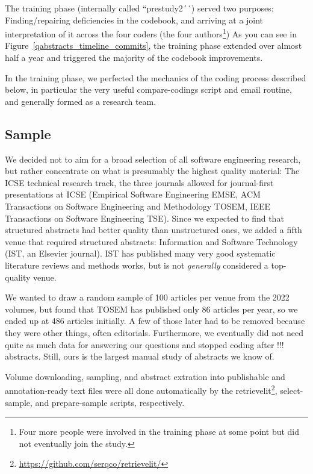 \documentclass[10pt,journal,compsoc]{IEEEtran}
\newcommand{\Prg}[1]{\bgroup\ttfamily #1\egroup}  %
\begin{document}
The training phase (internally called ``prestudy2´´) served two purposes:
Finding/repairing deficiencies in the codebook,
and arriving at a joint interpretation of it across the four coders 
(the four authors\footnote{Four more people were involved in the training phase at some
  point but did not eventually join the study.})
As you can see in Figure~\ref{qabstracts_timeline_commits},
the training phase extended over almost half a year and triggered
the majority of the codebook improvements.

In the training phase, we perfected the mechanics of the coding process
described below, in particular the very useful \Prg{compare-codings} script
and email routine,
and generally formed as a research team.


\subsection{Sample}

We decided not to aim for a broad selection of all software engineering research,
but rather concentrate on what is presumably the highest quality material:
The ICSE technical research track,
the three journals allowed for journal-first presentations at ICSE
(Empirical Software Engineering EMSE, 
ACM Transactions on Software Engineering and Methodology TOSEM, 
IEEE Transactions on Software Engineering TSE).
Since we expected to find that structured abstracts had better quality
than unstructured ones, we added a fifth venue that required structured abstracts:
Information and Software Technology (IST, an Elsevier journal).
IST has published many very good systematic literature reviews and methods works,
but is not \emph{generally} considered a top-quality venue.

We wanted to draw a random sample of 100 articles per venue from the
2022 volumes, but found that TOSEM has published only 86 articles per year,
so we ended up at 486 articles initially.
A few of those later had to be removed because they were other things,
often editorials.
Furthermore, we eventually did not need quite as much data for answering our
questions and stopped coding after !!! abstracts.
Still, ours is the largest manual study of abstracts we know of.

Volume downloading, sampling, and abstract extration into publishable 
and annotation-ready text files were all done automatically by the
retrievelit\footnote{\url{https://github.com/serqco/retrievelit/}},
select-sample, and prepare-sample scripts, respectively.
\end{document}
